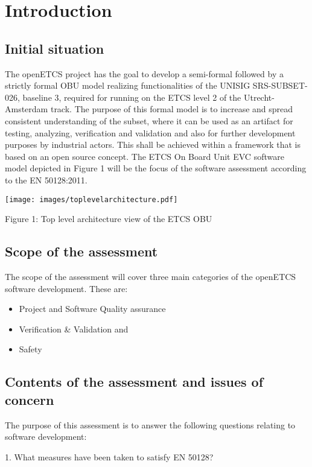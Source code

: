 \section{Introduction}
\subsection{Initial situation}
The openETCS project has the goal to develop a semi-formal followed by a strictly formal OBU model realizing
functionalities of the UNISIG SRS-SUBSET-026, baseline 3, required for running on the ETCS level 2 of the
Utrecht-Amsterdam track. The purpose of this formal model is to increase and spread consistent understanding of the
subset, where it can be used as an artifact for testing, analyzing, verification and validation and also for further
development purposes by industrial actors. This shall be achieved within a framework that is based on an open source
concept. The ETCS On Board Unit EVC software model depicted in Figure 1 will be the focus of the software assessment
according to the EN 50128:2011.

 \texttt{[image: images/toplevelarchitecture.pdf]} 

Figure 1: Top level architecture view of the ETCS OBU


\bigskip

\subsection{Scope of the assessment}
The scope of the assessment will cover three main categories of the openETCS software development. These are:

\liststyleLiv
\begin{itemize}
\item Project and Software Quality assurance 
\item Verification \& Validation and 
\item Safety 
\end{itemize}

\bigskip

\subsection{Contents of the assessment and issues of concern}
The purpose of this assessment is to answer the following questions relating to software development:

1. What measures have been taken to satisfy EN 50128?

